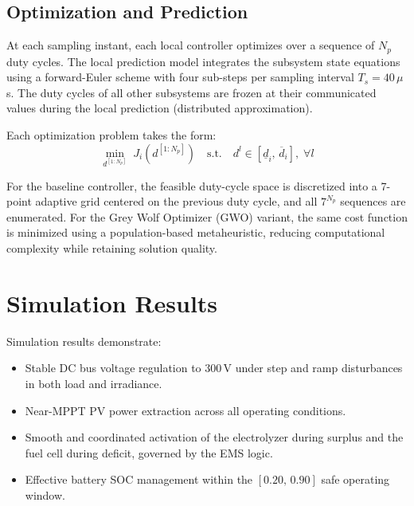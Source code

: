 \documentclass[journal]{IEEEtran}
\begin{document}
\subsection{Optimization and Prediction}

At each sampling instant, each local controller optimizes over a sequence
of $N_p$ duty cycles. The local prediction model integrates the subsystem
state equations using a forward-Euler scheme with four sub-steps per
sampling interval $T_s = 40\,\mu$s. The duty cycles of all other
subsystems are frozen at their communicated values during the local
prediction (distributed approximation).

Each optimization problem takes the form:
\begin{equation}
\min_{d^{[1:N_p]}} \; J_i(d^{[1:N_p]})
\quad \text{s.t.} \quad d^l \in [\underline{d}_i,\, \overline{d}_i], \;\forall l
\label{eq:local_opt}
\end{equation}

For the baseline controller, the feasible duty-cycle space is discretized
into a 7-point adaptive grid centered on the previous duty cycle, and all
$7^{N_p}$ sequences are enumerated. For the Grey Wolf Optimizer (GWO)
variant, the same cost function is minimized using a population-based
metaheuristic, reducing computational complexity while retaining solution
quality.

\section{Simulation Results}
\label{sec:results}


Simulation results demonstrate:
\begin{itemize}
\item Stable DC bus voltage regulation to $300$\,V under step and ramp
      disturbances in both load and irradiance.
\item Near-MPPT PV power extraction across all operating conditions.
\item Smooth and coordinated activation of the electrolyzer during surplus
      and the fuel cell during deficit, governed by the EMS logic.
\item Effective battery SOC management within the $[0.20,\, 0.90]$ safe
      operating window.
\end{itemize}
\end{document}
